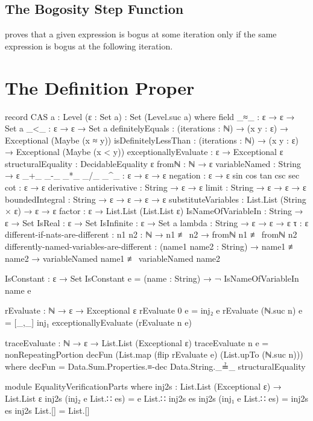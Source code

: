 \documentclass{report}
\begin{document}
\subsection{The Bogosity Step Function}
 proves that a given expression is bogus at some iteration only if the same expression is bogus at the following iteration.

\section{The Definition Proper}

\begin{code}
record CAS {a : Level} (ε : Set a) : Set (Level.suc a) where
  field
    _≈_ : ε → ε → Set a
    _<_ : ε → ε → Set a
    definitelyEquals : (iterations : ℕ) →
                       (x y : ε) →
                       Exceptional (Maybe (x ≈ y))
    isDefinitelyLessThan : (iterations : ℕ) →
                           (x y : ε) →
                           Exceptional (Maybe (x < y))
    exceptionallyEvaluate : ε → Exceptional ε
    structuralEquality : DecidableEquality ε
    fromℕ : ℕ → ε
    variableNamed : String → ε
    _+_
     _-_
     _*_
     _/_
     _^_ : ε → ε → ε
    negation : ε → ε
    sin
     cos
     tan
     csc
     sec
     cot : ε → ε
    derivative
     antiderivative : String → ε → ε
    limit : String → ε → ε → ε
    boundedIntegral : String → ε → ε → ε → ε
    substituteVariables : List.List (String × ε) → ε → ε
    factor : ε → List.List (List.List ε)
    IsNameOfVariableIn : String → ε → Set
    IsReal : ε → Set
    IsInfinite : ε → Set a
    lambda : String → ε → ε → ε
    τ : ε
    different-if-nats-are-different :
      {n1 n2 : ℕ} → n1 ≢ n2 → fromℕ n1 ≢ fromℕ n2
    differently-named-variables-are-different :
      (name1 name2 : String) →
      name1 ≢ name2 →
      variableNamed name1 ≢ variableNamed name2

  IsConstant : ε → Set
  IsConstant e = (name : String) → ¬ IsNameOfVariableIn name e

  rEvaluate : ℕ → ε → Exceptional ε
  rEvaluate 0 e = inj₂ e
  rEvaluate (ℕ.suc n) e = [_,_] inj₁ exceptionallyEvaluate (rEvaluate n e)

  traceEvaluate : ℕ → ε → List.List (Exceptional ε)
  traceEvaluate n e =
    nonRepeatingPortion decFun (List.map (flip rEvaluate e) (List.upTo (ℕ.suc n)))
      where decFun = Data.Sum.Properties.≡-dec Data.String._≟_ structuralEquality

  module EqualityVerificationParts where
    inj2s : List.List (Exceptional ε) → List.List ε
    inj2s (inj₂ e List.∷ es) = e List.∷ inj2s es
    inj2s (inj₁ e List.∷ es) = inj2s es
    inj2s List.[] = List.[]


\end{code}
\end{document}
